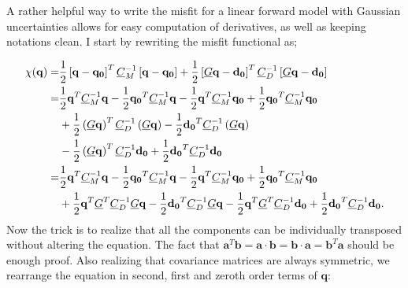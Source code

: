 A rather helpful way to write the misfit for a linear forward model with Gaussian uncertainties allows for easy computation of derivatives, as well as keeping notations clean. I start by rewriting the misfit functional as;

\begin{align}
	\chi(\mathbf{q}) =& \frac{1}{2} \left[ \mathbf{q} -\mathbf{q_0}\right]^T \MatrixVariable{C}_M ^{-1}\left[ \mathbf{q} -  \mathbf{q_0}\right] 
	+ \frac{1}{2} \left[ \MatrixVariable{G}\mathbf{q} -\mathbf{d_0}\right]^T \MatrixVariable{C}_D ^{-1}\left[\MatrixVariable{G}\mathbf{q} -  \mathbf{d_0}\right]\nonumber\\
	=&\frac{1}{2} \mathbf{q}^T \MatrixVariable{C}_M ^{-1}\mathbf{q} 
	- \frac{1}{2} \mathbf{q_0}^T \MatrixVariable{C}_M ^{-1}\mathbf{q} 
	- \frac{1}{2} \mathbf{q}^T \MatrixVariable{C}_M ^{-1}\mathbf{q_0} 
	+ \frac{1}{2} \mathbf{q_0}^T \MatrixVariable{C}_M ^{-1}\mathbf{q_0}\nonumber\\
	&+ \frac{1}{2}\left( \MatrixVariable{G} \mathbf{q} \right)^T \MatrixVariable{C}_D ^{-1}\left( \MatrixVariable{G} \mathbf{q} \right)
	-\frac{1}{2} \mathbf{d_0} ^T \MatrixVariable{C}_D ^{-1}\left( \MatrixVariable{G} \mathbf{q} \right)\nonumber\\
	&-\frac{1}{2}\left( \MatrixVariable{G} \mathbf{q} \right)^T \MatrixVariable{C}_D ^{-1}\mathbf{d_0}
	+\frac{1}{2}\mathbf{d_0}^T \MatrixVariable{C}_D ^{-1}\mathbf{d_0}\nonumber\\
	=&\frac{1}{2} \mathbf{q}^T \MatrixVariable{C}_M ^{-1}\mathbf{q} 
	- \frac{1}{2} \mathbf{q_0}^T \MatrixVariable{C}_M ^{-1}\mathbf{q} 
	- \frac{1}{2} \mathbf{q}^T \MatrixVariable{C}_M ^{-1}\mathbf{q_0} 
	+ \frac{1}{2} \mathbf{q_0}^T \MatrixVariable{C}_M ^{-1}\mathbf{q_0\nonumber}\\
	&+ \frac{1}{2}\mathbf{q}^T \MatrixVariable{G}^T  \MatrixVariable{C}_D ^{-1} \MatrixVariable{G} \mathbf{q} 
	-\frac{1}{2} \mathbf{d_0} ^T \MatrixVariable{C}_D ^{-1} \MatrixVariable{G} \mathbf{q} %
	-\frac{1}{2} \mathbf{q}^T  \MatrixVariable{G}^T \MatrixVariable{C}_D ^{-1}\mathbf{d_0}
	+\frac{1}{2}\mathbf{d_0}^T \MatrixVariable{C}_D ^{-1}\mathbf{d_0}.
\end{align}
Now the trick is to realize that all the components can be individually transposed without altering the equation. The fact that $ \mathbf{a}^T \mathbf{b} = \mathbf{a} \cdot \mathbf{b} = \mathbf{b} \cdot \mathbf{a} = \mathbf{b}^T \mathbf{a}$ should be enough proof. Also realizing that  covariance matrices are always symmetric, we rearrange the equation in second, first and zeroth order terms of $\mathbf{q}$:
